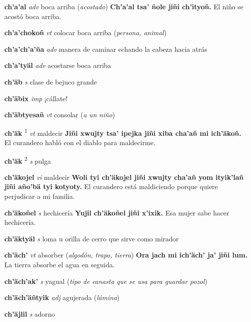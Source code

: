 \documentclass[10pt]{scrbook}
\newcommand{\entry}[1]{\textbf{#1}}
\newcommand{\defsuperscript}[1]{\textsuperscript{#1}}
\newcommand{\partofspeech}[1]{\textit{#1}}
\newcommand{\spanishtranslation}[1]{#1}
\newcommand{\clarification}[1]{(\textit{#1})}
\newcommand{\cholexample}[1]{\textbf{#1}}
\newcommand{\exampletranslation}[1]{#1}
\begin{document}
\begin{multicols}{2}
\entry{ch'a'al}
\partofspeech{adv}
\spanishtranslation{boca arriba}
\clarification{acostado}
\cholexample{Ch'a'al tsa' ñole jiñi ch'ityoñ.}
\exampletranslation{El niño se acostó boca arriba.}

\entry{ch'a'chokoñ}
\partofspeech{vt}
\spanishtranslation{colocar boca arriba}
\clarification{persona, animal}

\entry{ch'a'ch'a'ña}
\partofspeech{adv}
\spanishtranslation{manera de caminar echando la cabeza hacia atrás}

\entry{ch'a'tyäl}
\partofspeech{adv}
\spanishtranslation{acostarse boca arriba}

\entry{ch'äb}
\partofspeech{s}
\spanishtranslation{clase de bejuco grande}

\entry{ch'äbix}
\partofspeech{imp}
\spanishtranslation{¡cállate!}

\entry{ch'äbtyesañ}
\partofspeech{vt}
\spanishtranslation{consolar}
\clarification{a un niño}

\entry{ch'äk}
\defsuperscript{1}
\partofspeech{vt}
\spanishtranslation{maldecir}
\cholexample{Jiñi xwujty tsa' ipejka jiñi xiba cha'añ mi ich'äkoñ.}
\exampletranslation{El curandero habló con el diablo para maldecirme.}

\entry{ch'äk}
\defsuperscript{2}
\partofspeech{s}
\spanishtranslation{pulga}

\entry{ch'äkojel}
\partofspeech{vi}
\spanishtranslation{maldecir}
\cholexample{Woli tyi ch'äkojel jiñi xwujty cha'añ yom ityik'lañ jiñi año'bä tyi kotyoty.}
\exampletranslation{El curandero está maldiciendo porque quiere perjudicar a mi familia.}

\entry{ch'äkoñel}
\partofspeech{s}
\spanishtranslation{hechicería}
\cholexample{Yujil ch'äkoñel jiñi x'ixik.}
\exampletranslation{Esa mujer sabe hacer hechicería.}

\entry{ch'äktyäl}
\partofspeech{s}
\spanishtranslation{loma u orilla de cerro que sirve como mirador}

\entry{ch'äch'}
\partofspeech{vt}
\spanishtranslation{absorber}
\clarification{algodón, trapo, tierra}
\cholexample{Ora jach mi ich'äch' ja' jiñi lum.}
\exampletranslation{La tierra absorbe el agua en seguida.}

\entry{ch'äch'ak'}
\partofspeech{s}
\spanishtranslation{yagual}
\clarification{tipo de canasta que se usa para guardar pozol}

\entry{ch'äch'äñtyik}
\partofspeech{adj}
\spanishtranslation{agujerada}
\clarification{lámina}

\entry{ch'äjlil}
\partofspeech{s}
\spanishtranslation{adorno}


\end{multicols}
\end{document}
